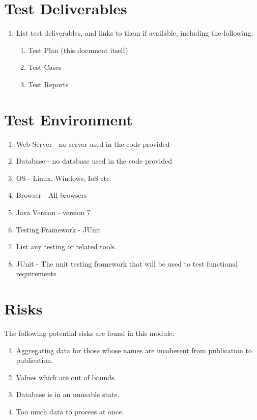 \section{Test Deliverables}

\begin{enumerate}
	\item List test deliverables, and links to them if available, including the following:

\begin{enumerate}
	\item Test Plan (this document itself)
	\item Test Cases 
	\item Test Reports
\end{enumerate}
\end{enumerate} 
\section{Test Environment} 

\begin{enumerate} 
	\item Web Server - no server used in the code provided
	\item Database - no database used in the code provided
	\item OS - Linux, Windows, IoS etc.
	\item Browser - All browsers
	\item Java Version - version 7
	\item Testing Framework - JUnit
	\item List any testing or related tools.
	\item JUnit - The unit testing framework that will be used to test functional requirements
\end{enumerate}

\section{Risks}
	The following potential risks are found in this module:
\begin{enumerate}
	\item Aggregating data for those whose names are incoherent from publication to publication.
	\item Values  which are out of bounds.
	\item Database is in an unusable state.
	\item Too much data to process at once.
\end{enumerate}

